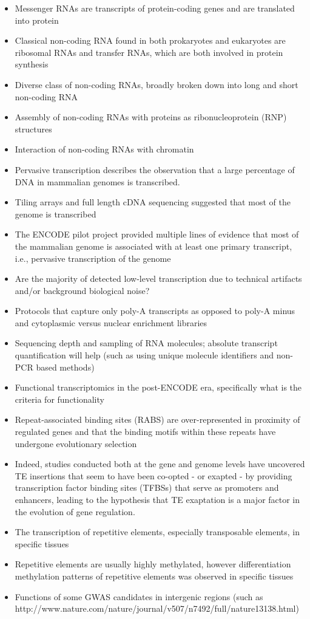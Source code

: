 \begin{itemize}
   \item Messenger RNAs are transcripts of protein-coding genes and are translated into protein
   \item Classical non-coding RNA found in both prokaryotes and eukaryotes are ribosomal RNAs and transfer RNAs, which are both involved in protein synthesis
   \item Diverse class of non-coding RNAs, broadly broken down into long and short non-coding RNA
   \item Assembly of non-coding RNAs with proteins as ribonucleoprotein (RNP) structures
   \item Interaction of non-coding RNAs with chromatin
   \item Pervasive transcription describes the observation that a large percentage of DNA in mammalian genomes is transcribed.
   \item Tiling arrays and full length cDNA sequencing suggested that most of the genome is transcribed
   \item The ENCODE pilot project provided multiple lines of evidence that most of the mammalian genome is associated with at least one primary transcript, i.e., pervasive transcription of the genome
   \item Are the majority of detected low-level transcription due to technical artifacts and/or background biological noise?
   \item Protocols that capture only poly-A transcripts as opposed to poly-A minus and cytoplasmic versus nuclear enrichment libraries
   \item Sequencing depth and sampling of RNA molecules; absolute transcript quantification will help (such as using unique molecule identifiers and non-PCR based methods)
   \item Functional transcriptomics in the post-ENCODE era, specifically what is the criteria for functionality
   \item Repeat-associated binding sites (RABS) are over-represented in proximity of regulated genes and that the binding motifs within these repeats have undergone evolutionary selection
   \item Indeed, studies conducted both at the gene and genome levels have uncovered TE insertions that seem to have been co-opted - or exapted - by providing transcription factor binding sites (TFBSs) that serve as promoters and enhancers, leading to the hypothesis that TE exaptation is a major factor in the evolution of gene regulation.
   \item The transcription of repetitive elements, especially transposable elements, in specific tissues
   \item Repetitive elements are usually highly methylated, however differentiation methylation patterns of repetitive elements was observed in specific tissues
   \item Functions of some GWAS candidates in intergenic regions (such as http://www.nature.com/nature/journal/v507/n7492/full/nature13138.html)
\end{itemize}


